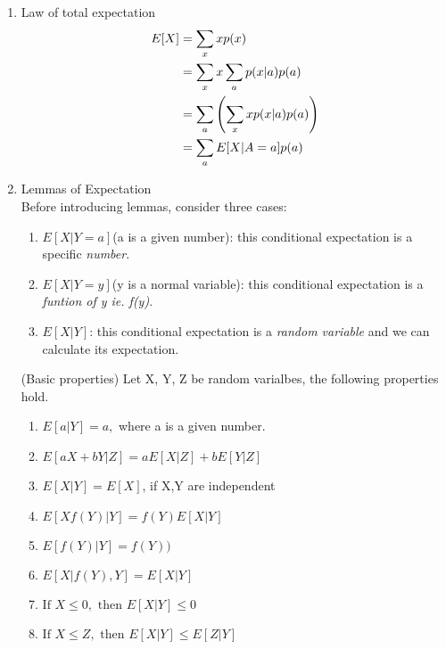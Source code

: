 \begin{enumerate}

	\item
	      Law of total expectation
	      \begin{align}
		      E[X] & = \sum_{x}xp(x) \notag                            \\
		           & = \sum_{x}x \sum_{a}p(x|a)p(a) \notag             \\
		           & = \sum_{a}\left(\sum_{x}xp(x|a)p(a)\right) \notag \\
		           & = \sum_{a}E[X|A=a]p(a)
	      \end{align}
	\item
	      Lemmas of Expectation \\ Before introducing lemmas, consider three cases:
	      \begin{enumerate}

		      \item
		            $E[X|Y=a]$(a is a given number): this conditional expectation is a specific \textit{number}.
		      \item
		            $E[X|Y=y]$(y is a normal variable): this conditional expectation is a \textit{funtion of y ie. f(y)}.
		      \item
		            $E[X|Y]$: this conditional expectation is a \textit{random variable} and we can calculate its expectation.

	      \end{enumerate}
	      \begin{lemma}{(Basic properties)}
		      \label{le2}
		      Let X, Y, Z be random varialbes, the following properties hold.
		      \begin{enumerate}

			      \item
			            $E[a|Y]=a,$ where a is a given number.
			      \item
			            $E[aX+bY|Z]= aE[X|Z]+bE[Y|Z]$
			      \item
			            $E[X|Y]=E[X]$, if X,Y are independent
			      \item
			            $E[Xf(Y)|Y] = f(Y)E[X|Y]$
			      \item
			            $E[f(Y)|Y]=f(Y))$
			      \item
			            $E[X|f(Y),Y]=E[X|Y]$
			      \item
			            $\text{If }X \le 0, \text{ then }E[X|Y] \le 0$
			      \item
			            $\text{If }X \le Z, \text{ then }E[X|Y] \le E[Z|Y]$


\end{enumerate}
\end{lemma}
\end{enumerate}
